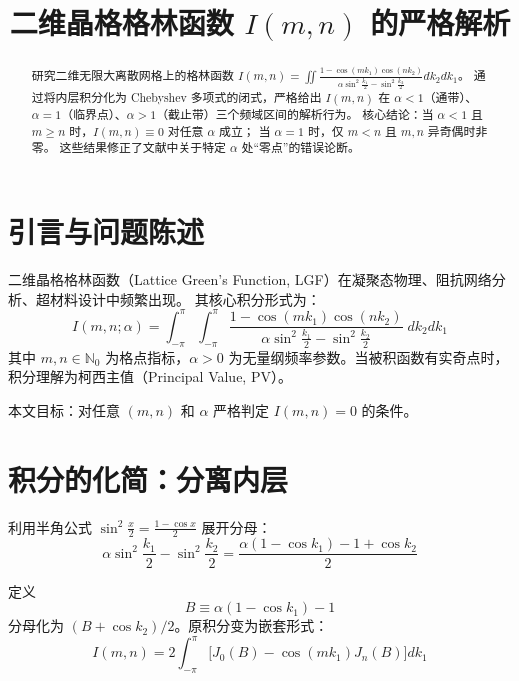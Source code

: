\documentclass[12pt,a4paper]{ctexart}
\title{二维晶格格林函数 $I(m,n)$ 的严格解析}
\author{}
\date{}
\begin{document}
\maketitle

\begin{abstract}
研究二维无限大离散网格上的格林函数
$I(m,n)=\iint\frac{1-\cos(mk_1)\cos(nk_2)}{\alpha\sin^2\frac{k_1}{2}-\sin^2\frac{k_2}{2}}dk_2dk_1$。
通过将内层积分化为 Chebyshev 多项式的闭式，严格给出 $I(m,n)$
在 $\alpha<1$（通带）、$\alpha=1$（临界点）、$\alpha>1$（截止带）三个频域区间的解析行为。
核心结论：当 $\alpha<1$ 且 $m\geq n$ 时，$I(m,n)\equiv0$ 对任意 $\alpha$ 成立；
当 $\alpha=1$ 时，仅 $m<n$ 且 $m,n$ 异奇偶时非零。
这些结果修正了文献中关于特定 $\alpha$ 处``零点''的错误论断。
\end{abstract}

\section{引言与问题陈述}

二维晶格格林函数（Lattice Green's Function, LGF）在凝聚态物理、阻抗网络分析、超材料设计中频繁出现。
其核心积分形式为：
\begin{equation}\label{eq:Imn}
I(m,n;\alpha)=\int_{-\pi}^{\pi}\int_{-\pi}^{\pi}
\frac{1-\cos(mk_1)\cos(nk_2)}
{\alpha\sin^2\frac{k_1}{2}-\sin^2\frac{k_2}{2}}\;dk_2dk_1
\end{equation}
其中 $m,n\in\mathbb{N}_0$ 为格点指标，$\alpha>0$ 为无量纲频率参数。当被积函数有实奇点时，积分理解为柯西主值（Principal Value, PV）。

本文目标：对任意 $(m,n)$ 和 $\alpha$ 严格判定 $I(m,n)=0$ 的条件。

\section{积分的化简：分离内层}

利用半角公式 $\sin^2\frac{x}{2}=\frac{1-\cos x}{2}$ 展开分母：
\begin{equation}
\alpha\sin^2\frac{k_1}{2}-\sin^2\frac{k_2}{2}
=\frac{\alpha(1-\cos k_1)-1+\cos k_2}{2}
\end{equation}

定义
\begin{equation}\label{eq:Bdef}
B\equiv\alpha(1-\cos k_1)-1
\end{equation}
分母化为 $(B+\cos k_2)/2$。原积分变为嵌套形式：
\begin{equation}\label{eq:nested}
\boxed{I(m,n)=2\int_{-\pi}^{\pi}\Big[J_0(B)-\cos(mk_1)J_n(B)\Big]dk_1}
\end{equation}
\end{document}
